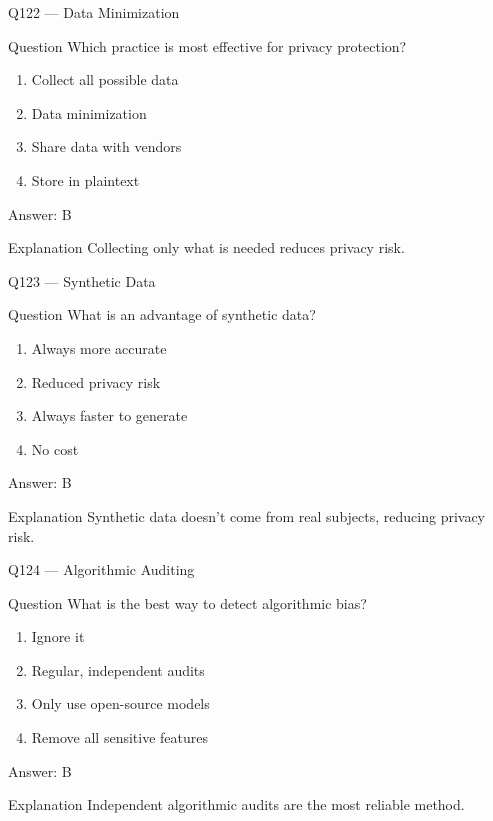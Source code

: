 \documentclass[aspectratio=169,8pt]{beamer}
\begin{document}
	\begin{frame}{Q122 --- Data Minimization}
		\begin{block}{Question}
			Which practice is most effective for privacy protection?
		\end{block}
		\begin{enumerate}
			\item Collect all possible data
			\item Data minimization
			\item Share data with vendors
			\item Store in plaintext
		\end{enumerate}
		\begin{exampleblock}{Answer: B}\end{exampleblock}
		\begin{block}{Explanation}
			Collecting only what is needed reduces privacy risk.
		\end{block}
	\end{frame}
	
	\begin{frame}{Q123 --- Synthetic Data}
		\begin{block}{Question}
			What is an advantage of synthetic data?
		\end{block}
		\begin{enumerate}
			\item Always more accurate
			\item Reduced privacy risk
			\item Always faster to generate
			\item No cost
		\end{enumerate}
		\begin{exampleblock}{Answer: B}\end{exampleblock}
		\begin{block}{Explanation}
			Synthetic data doesn't come from real subjects, reducing privacy risk.
		\end{block}
	\end{frame}
	
	\begin{frame}{Q124 --- Algorithmic Auditing}
		\begin{block}{Question}
			What is the best way to detect algorithmic bias?
		\end{block}
		\begin{enumerate}
			\item Ignore it
			\item Regular, independent audits
			\item Only use open-source models
			\item Remove all sensitive features
		\end{enumerate}
		\begin{exampleblock}{Answer: B}\end{exampleblock}
		\begin{block}{Explanation}
			Independent algorithmic audits are the most reliable method.
		\end{block}
	\end{frame}
	
\end{document}
